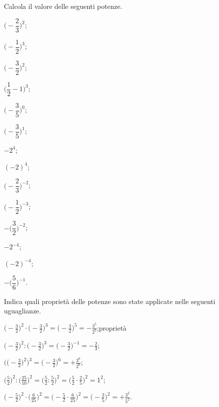 \begin{esercizio}
 \label{ese:3.62}
Calcola il valore delle seguenti potenze.
\begin{multicols}{4}
\begin{enumeratea}
\spazielenx
 \item $\bigg(-\dfrac{2}{3}\bigg)^2$;
 \item $\bigg(-\dfrac{1}{2}\bigg)^3$;
 \item $\bigg(-\dfrac{3}{2}\bigg)^2$;
 \item $\bigg(\dfrac{1}{2}-1\bigg)^3$;
 \item $\bigg(-\dfrac{3}{5}\bigg)^0$;
 \item $\bigg(-\dfrac{3}{5}\bigg)^1$;
 \item $-2^4$;
 \item $(-2)^4$;
 \item $\bigg(-\dfrac{2}{3}\bigg)^{-2}$;
 \item $\bigg(-\dfrac{1}{2}\bigg)^{-3}$;
 \item $-\bigg(\dfrac{3}{2}\bigg)^{-2}$;
 \item $-2^{-4}$;
 \item $(-2)^{-4}$;
 \item $-\bigg(\dfrac{5}{6}\bigg)^{-1}$.
\end{enumeratea}
\end{multicols}
\end{esercizio}

\begin{esercizio}
 \label{ese:3.63}
Indica quali proprietà delle potenze sono state applicate nelle seguenti uguaglianze.
\begin{enumeratea}
\spazielenx
 \item $\displaystyle{\bigg(-\frac{3}{2}\bigg)^2\cdot\bigg(-\frac{3}{2}\bigg)^{3}=%
\bigg(-\frac{3}{2}\bigg)^{5}=-\frac{3^5}{2^5}}$;\qquad proprietà \dotfill
 \item $\displaystyle{\bigg(-\frac{3}{2}\bigg)^2:\bigg(-\frac{3}{2}\bigg)^{3}=\bigg(-\frac{3}{2}\bigg)^{-1}=%
-\frac{2}{3}}$;
 \item $\displaystyle{\Bigg(\bigg(-\frac{3}{2}\bigg)^2\Bigg)^3=\bigg(-\frac{3}{2}\bigg)^{6}=%
+\frac{3^6}{2^6}}$;
 \item $\displaystyle{\bigg(\frac{5}{2}\bigg)^2:\bigg(\frac{25}{10}\bigg)^2=\bigg(\frac{5}{2}:\frac{5}{2}\bigg)^2=%
\bigg(\frac{5}{2}\cdot\frac{2}{5}\bigg)^2=1^2}$;
 \item $\displaystyle{\bigg(-\frac{5}{2}\bigg)^{2}\cdot\bigg(\frac{6}{25}\bigg)^{2}=\bigg(-\frac{5}{2}\cdot%
\frac{6}{25}\bigg)^{2}=\bigg(-\frac{3}{5}\bigg)^2=+\frac{3^2}{5^2}}$.
\end{enumeratea}
\end{esercizio}

